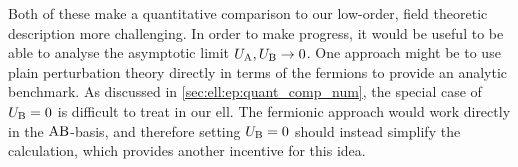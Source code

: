 Both of these make a quantitative comparison to our low-order, field theoretic description more challenging.
In order to make progress, it would be useful to be able to analyse the asymptotic limit $U_{\text{A}},U_{\text{B}}\rightarrow 0$.
One approach might be to use plain perturbation theory directly in terms of the fermions to provide an analytic benchmark.
As discussed in \autoref{sec:ell:ep:quant_comp_num}, the special case of $U_{\text{B}}=0$ is difficult to treat in our \gls{ell}.
The fermionic approach would work directly in the $\text{A}\text{B}$-basis, and therefore setting $U_{\text{B}}=0$ should instead simplify the calculation, which provides another incentive for this idea.
